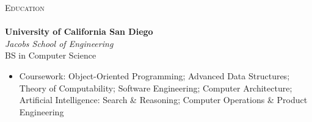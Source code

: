 \documentclass[a4paper]{article}
\newcommand{\lineunder} {
    \vspace*{-8pt} \\
    \hspace*{-18pt} \hrulefill \\
}
\newcommand{\header} [1] {
    {\hspace*{-18pt}\vspace*{6pt} \textsc{#1}}
    \vspace*{-6pt} \lineunder
}
\begin{document}
\header{Education}
\textbf{University of California San Diego}\hfill \\
\textit{Jacobs School of Engineering} \\
BS in Computer Science \hfill \\
\begin{itemize} \itemsep 1pt
	\item Coursework: Object-Oriented Programming; Advanced Data Structures; Theory of Computability; Software Engineering; Computer Architecture; Artificial Intelligence: Search \& Reasoning; Computer Operations \& Product Engineering \\
\end{itemize}

\vspace{2mm}
\end{document}
